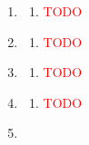 \begin{enumerate}[label=(\roman*)]
    \item 

        \begin{multicols}{2}
        \begin{enumerate}[label=(\alph*)]
            \setlength\itemsep{0em}
            \item \textcolor{red}{TODO} 
        \end{enumerate}
        \end{multicols}

    \item 

        \begin{multicols}{2}
        \begin{enumerate}[label=(\alph*)]
            \setlength\itemsep{0em}
            \item \textcolor{red}{TODO} 
        \end{enumerate}
        \end{multicols}

    \item 

        \begin{multicols}{2}
        \begin{enumerate}[label=(\alph*)]
            \setlength\itemsep{0em}
            \item \textcolor{red}{TODO} 
        \end{enumerate}
        \end{multicols}

    \item 

        \begin{multicols}{2}
        \begin{enumerate}[label=(\alph*)]
            \setlength\itemsep{0em}
            \item \textcolor{red}{TODO} 
        \end{enumerate}
        \end{multicols}

    \item 


\end{enumerate}
